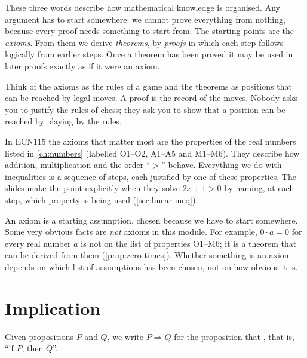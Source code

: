 These three words describe how mathematical knowledge is organised. Any argument has to start
somewhere: we cannot prove everything from nothing, because every proof needs something to start from.
The starting points are the \emph{axioms}. From them we derive \emph{theorems}, by \emph{proofs} in which
each step follows logically from earlier steps. Once a theorem has been proved it may be used in later
proofs exactly as if it were an axiom.

\begin{intuition}
Think of the axioms as the rules of a game and the theorems as positions that can be reached by legal
moves. A proof is the record of the moves. Nobody asks you to justify the rules of chess; they ask you to
show that a position can be reached by playing by the rules.
\end{intuition}

In ECN115 the axioms that matter most are the properties of the real numbers listed in
\cref{ch:numbers} (labelled O1--O2, A1--A5 and M1--M6). They describe how addition, multiplication and
the order ``$>$'' behave. Everything we do with inequalities is a sequence of steps, each justified by
one of these properties. The slides make the point explicitly when they solve $2x+1>0$ by naming, at
each step, which property is being used (\cref{sec:linear-ineq}).

\begin{warning}
An axiom is a starting assumption, chosen because we have to start somewhere. Some very obvious facts
are \emph{not} axioms in this module. For example, $0\cdot a=0$ for every real number $a$ is not on the
list of properties O1--M6; it is a theorem that can be derived from them (\cref{prop:zero-times}).
Whether something is an axiom depends on which list of assumptions has been chosen, not on how obvious
it is.
\end{warning}

\section{Implication}\label{sec:implication}

\begin{definition}
Given propositions $P$ and $Q$, we write $P\Rightarrow Q$ for the proposition that ,
that is, ``if $P$, then $Q$''. 
\end{definition}

